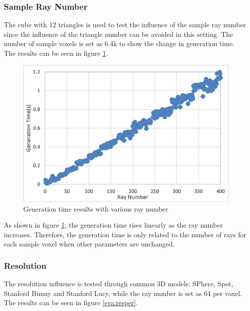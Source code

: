 \subsubsection{Sample Ray Number}

The cube with 12 triangles is used to test the influence of the sample ray number since the influence of the triangle number can be avoided in this setting. The number of sample voxels is set as 6.4k to show the change in generation time. The results can be seen in figure \ref{eva:rayper}.

\begin{figure}[htbp]
    \centering
    \includegraphics[width=14cm]{Images/Chap5/Ray.png}
    \caption{Generation time results with various ray number}
    \label{eva:rayper}
\end{figure}

As shown in figure \ref{eva:rayper}, the generation time rises linearly as the ray number increases. Therefore, the generation time is only related to the number of rays for each sample voxel when other parameters are unchanged.

\subsubsection{Resolution}

The resolution influence is tested through common 3D models: SPhere, Spot, Stanford Bunny and Stanford Lucy, while the ray number is set as 64 per voxel. The results can be seen in figure \ref{eva:resper}.


